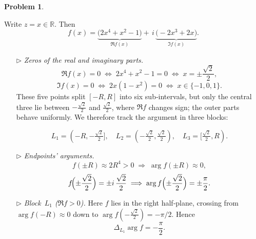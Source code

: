 \documentclass[12pt]{article}
\theoremstyle{definition} %
\newtheorem{problem}{Problem}
\theoremstyle{plain} %
\begin{document}
\begin{problem}
\begin{enumerate}
          Write $z=x\in\mathbb R$.  Then
          \[
              f(x)=\underbrace{\bigl(2x^{4}+x^{2}-1\bigr)}_{\displaystyle
                      \Re f(x)}
                   +\,i\,\underbrace{\bigl(-2x^{3}+2x\bigr)}_{\displaystyle
                      \Im f(x)}.
          \]

          \begin{enumerate}
          \item[$\triangleright$] \emph{Zeros of the real and imaginary parts.}
                \[
                    \Re f(x)=0
                    \;\Longleftrightarrow\;
                    2x^{4}+x^{2}-1=0
                    \;\Longleftrightarrow\;
                    x=\pm\frac{\sqrt2}{2},
                \]
                \[
                    \Im f(x)=0
                    \;\Longleftrightarrow\;
                    2x(1-x^{2})=0
                    \;\Longleftrightarrow\;
                    x\in\{-1,0,1\}.
                \]
                These five points split $[-R,R]$ into six sub‑intervals, but
                only the central three lie between $-\tfrac{\sqrt2}{2}$ and
                $\tfrac{\sqrt2}{2}$, where $\Re f$ changes sign; the outer
                parts behave uniformly.  We therefore track the argument in
                three blocks:

                \[
                    L_{1}=(-R,-\tfrac{\sqrt2}{2}],\quad
                    L_{2}=(-\tfrac{\sqrt2}{2},\tfrac{\sqrt2}{2}),\quad
                    L_{3}=[\tfrac{\sqrt2}{2},R).
                \]

          \item[$\triangleright$] \emph{Endpoints’ arguments.}
                \[
                    f(\pm R)\approx 2R^{4}>0
                    \;\Longrightarrow\;
                    \arg f(\pm R)\approx 0,
                \]
                \[
                    f\!\Bigl(\pm\frac{\sqrt2}{2}\Bigr)
                    = \pm i\,\frac{\sqrt2}{2}
                    \;\Longrightarrow\;
                    \arg f\Bigl(\pm\frac{\sqrt2}{2}\Bigr)
                    = \pm\frac{\pi}{2}.
                \]

          \item[$\triangleright$] \emph{Block $L_{1}$ ($\Re f>0$).}  
                Here $f$ lies in the right half‑plane, crossing from
                $\arg f(-R)\approx0$ down to
                $\arg f(-\tfrac{\sqrt2}{2})=-\pi/2$.  Hence
                \[
                    \Delta_{L_{1}}\arg f=-\frac{\pi}{2}.
                \]


\end{enumerate}
\end{enumerate}
\end{problem}
\end{document}
